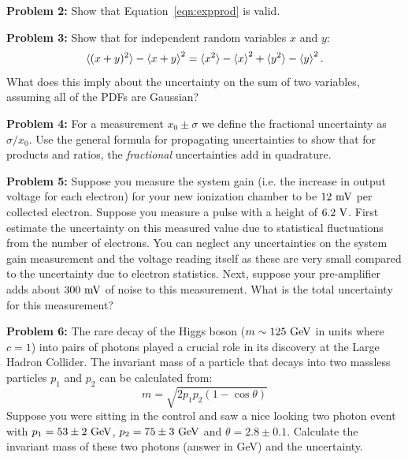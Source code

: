\documentclass[12pt,oneside]{book}
\begin{document}
\noindent
{\bf Problem 2:}  Show that Equation~\ref{eqn:expprod} is valid. \\ \vskip 0.25cm

\noindent
{\bf Problem 3:}  Show that for independent random variables $x$ and $y$:
\begin{displaymath}
\braket{(x+y)^2} - \braket{x+y}^2 = \braket{x^2} - \braket{x}^2 + \braket{y^2} - \braket{y}^2.
\end{displaymath}
What does this imply about the uncertainty on the sum of two variables, assuming all of the PDFs are Gaussian? \\ \vskip 0.25cm

\noindent
{\bf Problem 4:}  For a measurement $x_0 \pm \sigma$ we define the fractional uncertainty as $\sigma/x_0$.  Use the general formula for propagating uncertainties to show that for products and ratios, the {\em fractional} uncertainties add in quadrature.  \\ \vskip 0.25cm

\noindent
{\bf Problem 5:}  Suppose you measure the system gain (i.e. the increase in output voltage for each electron) for your new ionization chamber to be $12~\rm mV$ per collected electron.  Suppose you measure a pulse with a height of $6.2~\rm V$.  First estimate the uncertainty on this measured value due to statistical fluctuations from the number of electrons.   You can neglect any uncertainties on the system gain measurement and the voltage reading itself as these are very small compared to the uncertainty due to electron statistics.  Next, suppose your pre-amplifier adds about $300~\rm mV$ of noise to this measurement.  What is the total uncertainty for this measurement? \\ \vskip 0.25cm

\noindent
{\bf Problem 6:}  The rare decay of the Higgs boson ($m \sim125~\rm GeV$ in units where $c=1$) into pairs of photons played a crucial role in its discovery at the Large Hadron Collider.  The invariant mass of a particle that decays into two massless particles $p_1$ and $p_2$ can be calculated from:
\begin{displaymath}
m = \sqrt{2  p_1 p_2 (1 - \cos\theta)}
\end{displaymath}
Suppose you were sitting in the control and saw a nice looking two photon event with 
$p_1=53 \pm 2~\rm GeV$, $p_2=75 \pm 3~\rm GeV$ and $\theta = 2.8 \pm 0.1$.   Calculate the invariant mass of these two photons (answer in GeV) and the uncertainty. \\ \vskip 0.25cm
\end{document}
